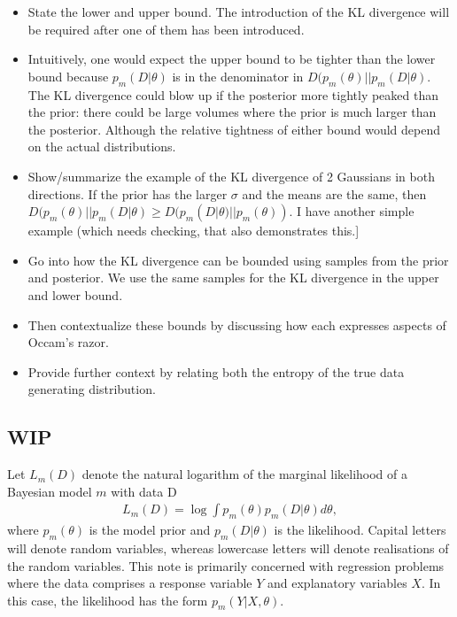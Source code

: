 \documentclass[10pt,a4paper]{article}
\begin{document}
\begin{itemize}
\item State the lower and upper bound. The introduction of the KL divergence will be required after one of them has been introduced.
\item Intuitively, one would expect the upper bound to be tighter than the lower bound because $p_m(D|\theta)$ is in the denominator in $D(p_m(\theta) || p_m(D|\theta)$. The KL divergence could blow up if the posterior more tightly peaked than the prior: there could be large volumes where the prior is much larger than the posterior. Although the relative tightness of either bound would depend on the actual distributions.
\item Show/summarize the example of the KL divergence of 2 Gaussians in both directions. If the prior has the larger $\sigma$ and the means are the same, then $D(p_m(\theta) || p_m(D|\theta) \geq D(p_m(D|\theta) || p_m(\theta))$. I have another simple example (which needs checking, that also demonstrates this.]
\item Go into how the KL divergence can be bounded using samples from the prior and posterior. We use the same samples for the KL divergence in the upper and lower bound.
\item Then contextualize these bounds by discussing how each expresses aspects of Occam's razor.
\item Provide further context by relating both the entropy of the true data generating distribution.
\end{itemize}



\subsection{WIP}
Let $L_m(D)$ denote the natural logarithm of the marginal likelihood of a Bayesian model $m$ with data D
\begin{align}
L_m(D) = \log \int p_m(\theta) p_m(D|\theta) d\theta,
\end{align}
where $p_m(\theta) $ is the model prior and $p_m(D|\theta) $ is the likelihood. Capital letters will denote random variables, whereas lowercase letters will denote realisations of the random variables. This note is primarily concerned with regression problems where the data comprises a response variable $Y$ and explanatory variables $X$. In this case, the likelihood has the form $p_m(Y|X, \theta)$.
\end{document}

